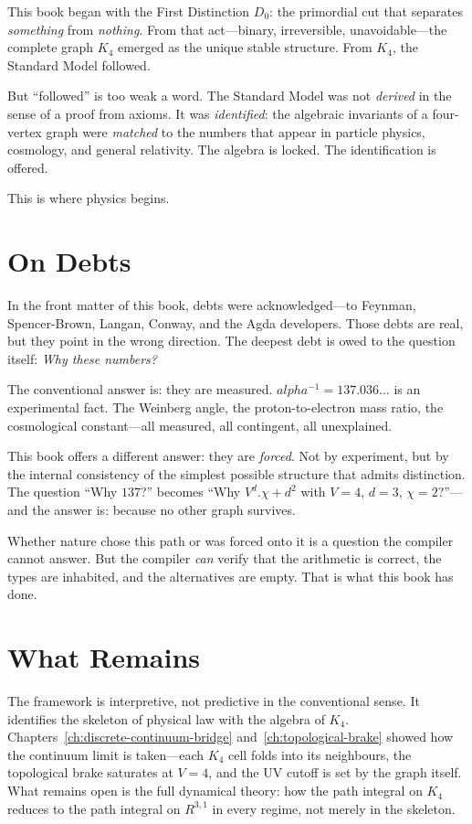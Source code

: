 \documentclass[11pt,a4paper]{book}
\def\alpha{alpha}%
\def\cdot{.}%
\def\mathbb#1{#1}%
\begin{document}
This book began with the First Distinction $D_0$: the primordial cut that separates \emph{something} from \emph{nothing}. From that act---binary, irreversible, unavoidable---the complete graph $K_4$ emerged as the unique stable structure. From $K_4$, the Standard Model followed.

But ``followed'' is too weak a word. The Standard Model was not \emph{derived} in the sense of a proof from axioms. It was \emph{identified}: the algebraic invariants of a four-vertex graph were \emph{matched} to the numbers that appear in particle physics, cosmology, and general relativity. The algebra is locked. The identification is offered.

This is where physics begins.

\section*{On Debts}

In the front matter of this book, debts were acknowledged---to Feynman, Spencer-Brown, Langan, Conway, and the Agda developers. Those debts are real, but they point in the wrong direction. The deepest debt is owed to the question itself: \emph{Why these numbers?}

The conventional answer is: they are measured. $\alpha^{-1} = 137.036\ldots$ is an experimental fact. The Weinberg angle, the proton-to-electron mass ratio, the cosmological constant---all measured, all contingent, all unexplained.

This book offers a different answer: they are \emph{forced}. Not by experiment, but by the internal consistency of the simplest possible structure that admits distinction. The question ``Why $137$?'' becomes ``Why $V^d \cdot \chi + d^2$ with $V = 4$, $d = 3$, $\chi = 2$?''---and the answer is: because no other graph survives.

Whether nature chose this path or was forced onto it is a question the compiler cannot answer. But the compiler \emph{can} verify that the arithmetic is correct, the types are inhabited, and the alternatives are empty. That is what this book has done.

\section*{What Remains}

The framework is interpretive, not predictive in the conventional sense. It identifies the skeleton of physical law with the algebra of $K_4$. Chapters~\ref{ch:discrete-continuum-bridge} and~\ref{ch:topological-brake} showed how the continuum limit is taken---each $K_4$ cell folds into its neighbours, the topological brake saturates at $V = 4$, and the UV cutoff is set by the graph itself. What remains open is the full dynamical theory: how the path integral on $K_4$ reduces to the path integral on $\mathbb{R}^{3,1}$ in every regime, not merely in the skeleton.
\end{document}

